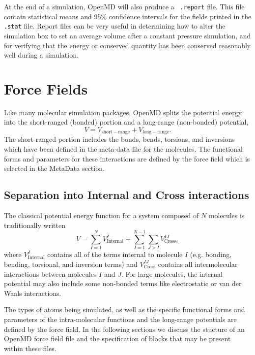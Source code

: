 \documentclass[letterpaper]{report}
\begin{document}
At the end of a simulation, OpenMD will also produce a {\tt
  .report} file. This file contain statistical means and 95\%
confidence intervals for the fields printed in the {\tt .stat} file.
Report files can be very useful in determining how to alter the
simulation box to set an average volume after a constant pressure
simulation, and for verifying that the energy or conserved quantity
has been conserved reasonably well during a simulation.

\chapter{\label{chapter:forceFields}Force Fields}

Like many molecular simulation packages, OpenMD splits the
potential energy into the short-ranged (bonded) portion and a
long-range (non-bonded) potential,
\begin{equation}
V = V_{\mathrm{short-range}} + V_{\mathrm{long-range}}.
\end{equation}
The short-ranged portion includes the bonds, bends, torsions, and
inversions which have been defined in the meta-data file for the
molecules.  The functional forms and parameters for these interactions
are defined by the force field which is selected in the MetaData
section.

\section{\label{section:divisionOfLabor}Separation into Internal and
  Cross interactions}

The classical potential energy function for a system composed of $N$
molecules is traditionally written
\begin{equation}
V = \sum^{N}_{I=1} V^{I}_{\text{Internal}}
	+ \sum^{N-1}_{I=1} \sum_{J>I} V^{IJ}_{\text{Cross}},
\label{eq:totalPotential}
\end{equation}
where $V^{I}_{\text{Internal}}$ contains all of the terms internal to
molecule $I$ (e.g. bonding, bending, torsional, and inversion terms)
and $V^{IJ}_{\text{Cross}}$ contains all intermolecular interactions
between molecules $I$ and $J$.  For large molecules, the internal
potential may also include some non-bonded terms like electrostatic or
van der Waals interactions.

The types of atoms being simulated, as well as the specific functional
forms and parameters of the intra-molecular functions and the
long-range potentials are defined by the force field. In the following
sections we discuss the stucture of an OpenMD force field file and the
specification of blocks that may be present within these files.
\end{document}
